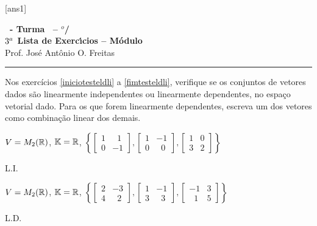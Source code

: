\documentclass[12pt]{exam}
\begin{document}
    [ans1]
    
    \begin{center}
        {\Large\bf \disciplina\ - Turma \turma\ -- \semestre$^{o}$/\ano} \\ \vspace{9pt} {\large\bf
            $3^a$ Lista de Exerc{\'\i}cios -- Módulo \numeromodulo}\\ \vspace{9pt} Prof. Jos{\'e} Ant{\^o}nio O. Freitas
    \end{center}
    
    \hrule

    Nos exercícios \ref{iniciotesteldli} a \ref{fimtesteldli}, verifique se os conjuntos de vetores dados são 
    linearmente independentes ou linearmente dependentes, 
    no espaço vetorial dado. Para os que forem linearmente dependentes,
    escreva um dos vetores como combinação linear dos demais.

    \begin{exercicio}\label{iniciotesteldli}
        $V = M_2(\mathbb{R})$, $\mathbb{K} = \mathbb{R}$,
        $
            \left\{
                \begin{bmatrix}
                    1 & \phantom{x} 1\\
                    0 & -1
                \end{bmatrix},
                \begin{bmatrix}
                    1 & -1\\
                    0 & \phantom{x} 0
                \end{bmatrix},
                \begin{bmatrix}
                    1 & 0\\
                    3 & 2
                \end{bmatrix}
            \right\}
        $
        \begin{solucao}
            L.I.
        \end{solucao}
    \end{exercicio}

    \begin{exercicio}
        $V = M_2(\mathbb{R})$, $\mathbb{K} = \mathbb{R}$,
        $
            \left\{
                \begin{bmatrix}
                    2 & -3\\
                    4 & \phantom{x} 2
                \end{bmatrix},
                \begin{bmatrix}
                    1 & -1\\
                    3 & \phantom{x} 3
                \end{bmatrix},
                \begin{bmatrix}
                    -1 & 3\\
                    \phantom{x} 1 & 5
                \end{bmatrix}
            \right\}
        $
        \begin{solucao}
            L.D.
        \end{solucao}
    \end{exercicio}
    
\end{document}
